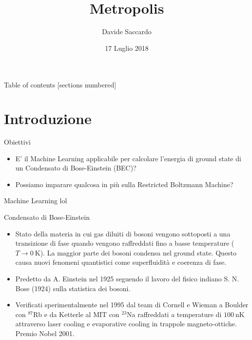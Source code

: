 \documentclass[10pt]{beamer}
\title{Metropolis}
\date{17 Luglio 2018}
\author{Davide Saccardo}
\institute{Università di Trento}
\begin{document}
\maketitle

\begin{frame}{Table of contents}
  [sections numbered]
  \tableofcontents[hideallsubsections]
\end{frame}

\section{Introduzione}

\begin{frame}[fragile]{Obiettivi}
\begin{itemize}
	\item E' il Machine Learning applicabile per calcolare l'energia di ground state di un Condensato di Bose-Einstein (BEC)?
	\item Possiamo imparare qualcosa in più sulla Restricted Boltzmann Machine?
\end{itemize}

\end{frame}

\begin{frame}[fragile]{Machine Learning}
	lol
\end{frame}


\begin{frame}[fragile]{Condensato di Bose-Einstein}
\begin{itemize}
 	\item Stato della materia in cui gas diluiti di bosoni vengono sottoposti a una transizione di fase quando vengono raffreddati fino a basse temperature ($T\rightarrow 0\ \si{\kelvin}$). La maggior parte dei bosoni condensa nel ground state. Questo causa nuovi fenomeni quantistici come superfluidità e coerenza di fase.
 	\item Predetto da A. Einstein nel 1925 seguendo il lavoro del fisico indiano S. N. Bose (1924) sulla statistica dei bosoni. 
 	\item Verificati sperimentalmente nel 1995 dal team di Cornell e Wieman a Boulder con $^{87}$Rb e da Ketterle al MIT con $^{23}$Na raffreddati a temperature di $100\ \si{\nano\kelvin}$ attraverso laser cooling e evaporative cooling in trappole magneto-ottiche. Premio Nobel 2001.
\end{itemize}
 
\end{frame}
\end{document}
